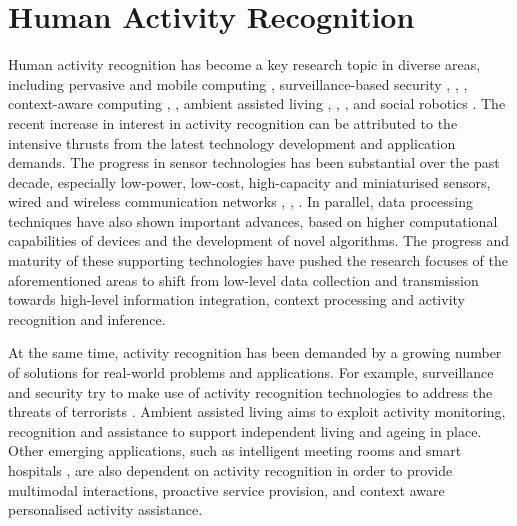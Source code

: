 \section{Human Activity Recognition}
\label{sec:soa:har}


Human activity recognition has become a key research topic in diverse areas, including pervasive and mobile computing \cite{Weiser1991} \cite{Choudhury2008}, surveillance-based security \cite{Poppe2010}, \cite{Akdemir2008}, \cite{Weinland2011}, context-aware computing \cite{Laerhoven2001}, \cite{Wren2006}, ambient assisted living \cite{Philipose2004}, \cite{Cook2009}, \cite{Kasteren2008}, \cite{Chen2012a} and social robotics \cite{Fong2003a}. The recent increase in interest in activity recognition can be attributed to the intensive thrusts from the latest technology development and application demands. The progress in sensor technologies has been substantial over the past decade, especially low-power, low-cost, high-capacity and miniaturised sensors, wired and wireless communication networks \cite{Pantelopoulos2010}, \cite{Alemdar2010}, \cite{Ding2011}. In parallel, data processing techniques have also shown important advances, based on higher computational capabilities of devices and the development of novel algorithms. The progress and maturity of these supporting technologies have pushed the research focuses of the aforementioned areas to shift from low-level data collection and transmission towards high-level information integration, context processing and activity recognition and inference. 

At the same time, activity recognition has been demanded by a growing number of solutions for real-world problems and applications. For example, surveillance and security try to make use of activity recognition technologies to address the threats of terrorists \cite{Akdemir2008}. Ambient assisted living aims to exploit activity monitoring, recognition and assistance to support independent living and ageing in place. Other emerging applications, such as intelligent meeting rooms \cite{Mikic2000} and smart hospitals \cite{Sanchez2008}, are also dependent on activity recognition in order to provide multimodal interactions, proactive service provision, and context aware personalised activity assistance. 

